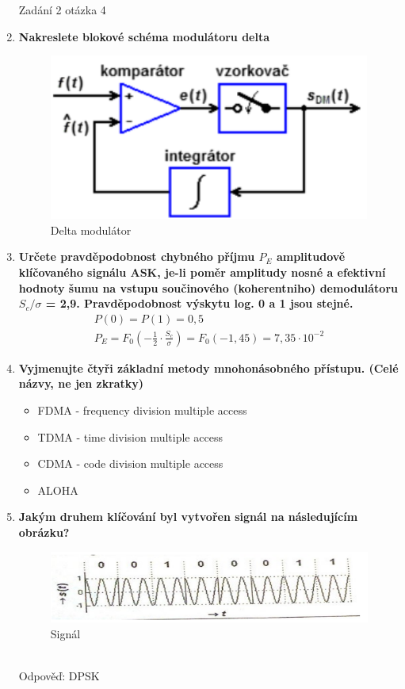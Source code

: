 \begin{enumerate}
    Zadání 2 otázka 4
    \newpage
    \item \textbf{Nakreslete blokové schéma modulátoru delta}
    \begin{figure}[h]
        \centering
        \includegraphics[scale = 0.7]{images/DM.png}
        \caption{Delta modulátor}
    \end{figure}
    \item \textbf{Určete pravděpodobnost chybného příjmu \(P_E\) amplitudově klíčovaného signálu ASK, je-li
    poměr amplitudy nosné a efektivní hodnoty šumu na vstupu součinového (koherentniho)
    demodulátoru \(S_c/\sigma\) = 2,9. Pravděpodobnost výskytu log. 0 a 1 jsou stejné.}
    \begin{gather*}
        P(0)=P(1)=0,5\\
        P_E = F_0(-\frac{1}{2}\cdot\frac{S_c}{\sigma}) = F_0(-1,45) = 7,35\cdot10^{-2}
    \end{gather*}
    \item \textbf{Vyjmenujte čtyři základní metody mnohonásobného přístupu. (Celé názvy, ne jen zkratky)}
    \begin{itemize}
        \item FDMA - frequency division multiple access
        \item TDMA - time division multiple access
        \item CDMA - code division multiple access
        \item ALOHA
    \end{itemize}
    \item \textbf{Jakým druhem klíčování byl vytvořen signál na následujícím obrázku?}\\
    \begin{figure}[h]
        \centering
        \includegraphics[scale = 0.7]{images/signal.png}
        \caption{Signál}
    \end{figure}\\
    Odpověď: DPSK
\end{enumerate}

